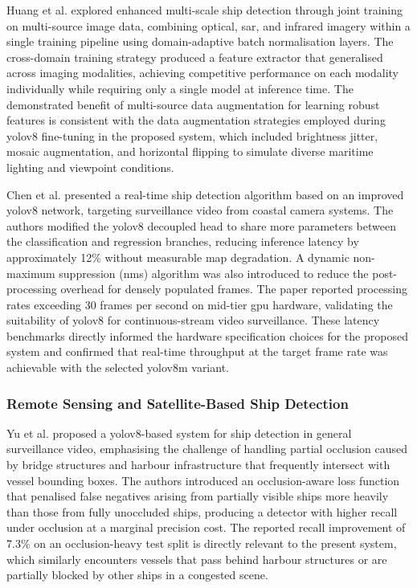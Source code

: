 Huang et al. \cite{Huang2024} explored enhanced multi-scale ship detection
through joint training on multi-source image data, combining optical, \gls{sar}, and
infrared imagery within a single training pipeline using domain-adaptive batch
normalisation layers. The cross-domain training strategy produced a feature
extractor that generalised across imaging modalities, achieving competitive
performance on each modality individually while requiring only a single model
at inference time. The demonstrated benefit of multi-source data augmentation
for learning robust features is consistent with the data augmentation strategies
employed during \gls{yolov8} fine-tuning in the proposed system, which included
brightness jitter, mosaic augmentation, and horizontal flipping to simulate
diverse maritime lighting and viewpoint conditions.
 
Chen et al. \cite{Chen2023} presented a real-time ship detection algorithm based
on an improved \gls{yolov8} network, targeting surveillance video from coastal camera
systems. The authors modified the \gls{yolov8} decoupled head to share more parameters
between the classification and regression branches, reducing inference latency by
approximately 12\% without measurable \gls{map} degradation. A dynamic non-maximum
suppression (\gls{nms}) algorithm was also introduced to reduce the post-processing
overhead for densely populated frames. The paper reported processing rates
exceeding 30 frames per second on mid-tier \gls{gpu} hardware, validating the suitability
of \gls{yolov8} for continuous-stream video surveillance. These latency benchmarks
directly informed the hardware specification choices for the proposed system and
confirmed that real-time throughput at the target frame rate was achievable with
the selected \gls{yolov8}m variant.
 
\subsubsection{\textbf{Remote Sensing and Satellite-Based Ship Detection}}
Yu et al. \cite{Yu2026} proposed a \gls{yolov8}-based system for ship detection in
general surveillance video, emphasising the challenge of handling partial
occlusion caused by bridge structures and harbour infrastructure that frequently
intersect with vessel bounding boxes. The authors introduced an occlusion-aware
loss function that penalised false negatives arising from partially visible ships
more heavily than those from fully unoccluded ships, producing a detector with
higher recall under occlusion at a marginal precision cost. The reported recall
improvement of 7.3\% on an occlusion-heavy test split is directly relevant to the
present system, which similarly encounters vessels that pass behind harbour
structures or are partially blocked by other ships in a congested scene.
 
